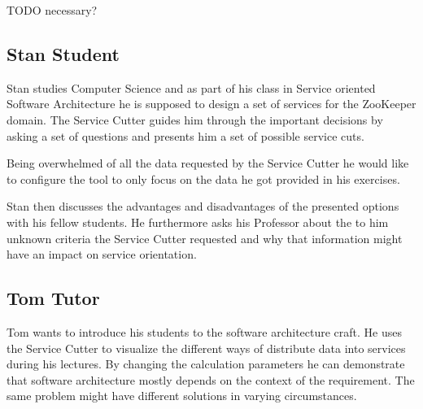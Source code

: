 
TODO necessary?

\subsection{Stan Student}

Stan studies Computer Science and as part of his class in Service oriented Software Architecture he is supposed to design a set of services for the ZooKeeper domain. The Service Cutter guides him through the important decisions by asking a set of questions and presents him a set of possible service cuts. 

Being overwhelmed of all the data requested by the Service Cutter he would like to configure the tool to only focus on the data he got provided in his exercises. 

Stan then discusses the advantages and disadvantages of the presented options with his fellow students. He furthermore asks his Professor about the to him unknown criteria the Service Cutter requested and why that information might have an impact on service orientation. 


\subsection{Tom Tutor}

Tom wants to introduce his students to the software architecture craft. He uses the Service Cutter to visualize the different ways of distribute data into services during his lectures. By changing the calculation parameters he can demonstrate that software architecture mostly depends on the context of the requirement. The same problem might have different solutions in varying circumstances.

